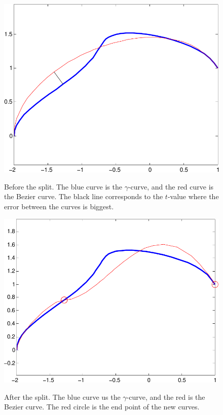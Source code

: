 \documentclass[10pt]{article}
\begin{document}
\begin{figure}
\centering
\begin{minipage}[t]{.4\textwidth}
\centering
\vspace{0pt}
    \includegraphics[scale=0.5]{kurvedeling1-crop.pdf}
    \label{fig:kurvedeling1}
    \caption{Before the split. The blue curve is the $\gamma$-curve, and the red curve is the Bezier curve. The black line corresponds to the $t$-value where the error between the curves is biggest.}
\end{minipage}\hfill
\begin{minipage}[t]{.4\textwidth}
\centering
\vspace{0pt}
    \includegraphics[scale=0.5]{kurvedeling2-crop.pdf}
    \label{fig:kurvedeling2}
    \caption{After the split. The blue curve us the $\gamma$-curve, and the red is the Bezier curve. The red circle is the end point of the new curves.}
\end{minipage}
\end{figure}
\end{document}
